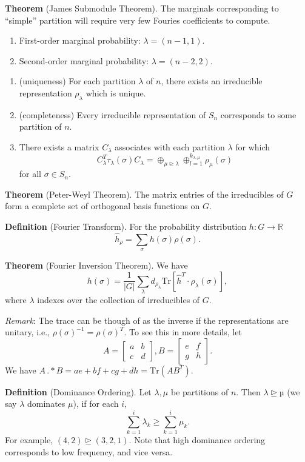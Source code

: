 \documentclass[10pt,reqno]{amsart}
\newcommand{\R}{\mathbb{R}}
\theoremstyle{definition}
\numberwithin{equation}{section}
\begin{document}
\noindent \textbf{Theorem} (James Submodule Theorem).
The marginals corresponding to ``simple'' partition
will require very few Fouries coefficients to compute.
\begin{enumerate}
\item  First-order marginal probability:
$\lambda = (n-1, 1).$
\item  Second-order marginal probability:
$\lambda = (n-2, 2).$
\end{enumerate}

\begin{enumerate}
\item (uniqueness) For each partition $\lambda$ of $n$,
there exists an irreducible representation
$\rho_\lambda$ which is unique.
\item (completeness) Every irreducible representation
of $S_n$ corresponds to some partition of $n$.
\item There exists a matrix $C_\lambda$ 
associates with each partition $\lambda$ for which
\[C_{\lambda}^T \tau_\lambda (\sigma) C_\lambda
=
\oplus_{\mu \unrhd \lambda}\oplus_{l=1}^{k_{\lambda,\mu}} \rho_{\mu}(\sigma)\]
for all $\sigma\in S_n.$
\end{enumerate}


\noindent \textbf{Theorem} (Peter-Weyl Theorem).
The matrix entries of the irreducibles
of $G$ form a complete set of orthogonal
basis functions on $G$.


\noindent \textbf{Definition} (Fourier Transform).
For the probability distribution $h:G\to \R$
\[\widehat{h}_\rho = \sum_\sigma h(\sigma)\rho(\sigma).\]

\noindent \textbf{Theorem} (Fourier Inversion Theorem).
We have
\[h(\sigma) = \frac{1}{|G|}\sum_{\lambda}
d_{\rho_\lambda} \text{Tr}[\widehat{h}^T\cdot \rho_\lambda(\sigma)],\]
where $\lambda$ indexes over the collection
of irreducibles of $G$.

\textit{Remark}: The trace can be though of as the inverse
if the representations are unitary, 
i.e., $\rho(\sigma)^{-1} = \rho(\sigma)^T.$ To
see this in more details,
let 
\[A =
\begin{bmatrix}
a & b\\
c & d
\end{bmatrix},
B =
\begin{bmatrix}
e & f\\
g & h
\end{bmatrix}.
\]
We have $A\,.*B = ae + bf + cg + dh = \text{Tr}(AB^T).$

\noindent \textbf{Definition} (Dominance Ordering).
Let $\lambda, \mu$ be partitions of $n$. Then 
$λ \unrhd µ$ (we say $\lambda$ dominates $\mu$),
if for each $i$, 
\[\sum_{k=1}^i \lambda_k \geq \sum_{k=1}^i \mu_k.\]
For example, $(4,2)\unrhd (3,2,1).$
Note that high dominance ordering 
corresponds to low frequency, and vice versa.
\end{document}
